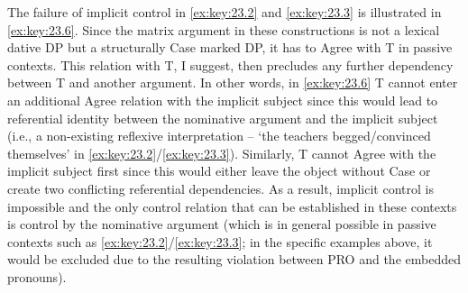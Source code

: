 \documentclass[output=paper]{langsci/langscibook}
\begin{document}
\ea%
    \label{ex:key:23.5}
\z
%
The failure of implicit control in \eqref{ex:key:23.2} and \eqref{ex:key:23.3}
is illustrated in \eqref{ex:key:23.6}. Since the matrix argument in these
constructions is not a lexical dative DP but a structurally Case marked DP, it
has to Agree with T in passive contexts. This relation with T, I suggest, then
precludes any further dependency between T and another argument. In other
words, in \eqref{ex:key:23.6} T cannot enter an additional Agree relation with
the implicit subject since this would lead to referential identity between the
nominative argument and the implicit subject (i.e., a
non-existing reflexive interpretation – ‘the teachers begged/convinced
themselves’ in \eqref{ex:key:23.2}/\eqref{ex:key:23.3}). Similarly, T cannot
Agree with the implicit subject first since this would either leave the object
without Case or create two conflicting referential dependencies. As a result,
implicit control is impossible and the only
control relation that can be established in these contexts is control by the
nominative argument (which is in general possible in
passive contexts such as \eqref{ex:key:23.2}/\eqref{ex:key:23.3};
in the specific examples above, it would be excluded due to the resulting
 violation between PRO and the embedded pronouns).
\end{document}
